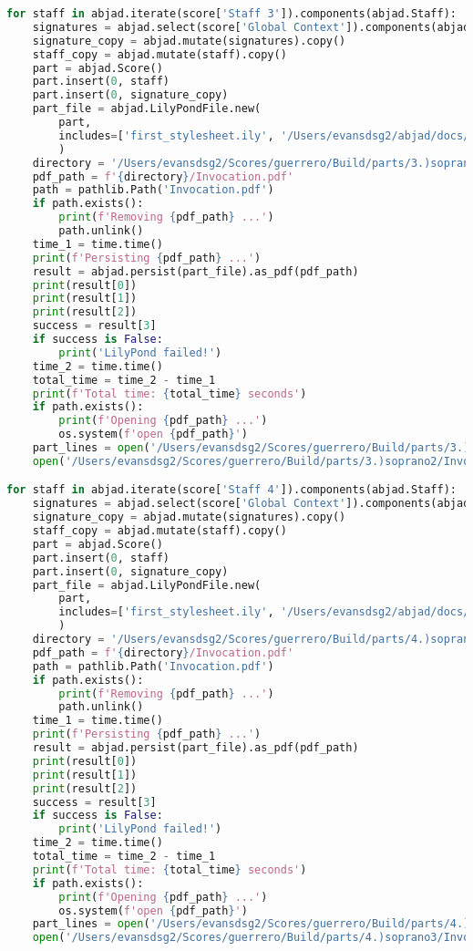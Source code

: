 \begin{lstlisting}[language=Python, caption=Invocation Source Code]
for staff in abjad.iterate(score['Staff 3']).components(abjad.Staff):
    signatures = abjad.select(score['Global Context']).components(abjad.Staff)
    signature_copy = abjad.mutate(signatures).copy()
    staff_copy = abjad.mutate(staff).copy()
    part = abjad.Score()
    part.insert(0, staff)
    part.insert(0, signature_copy)
    part_file = abjad.LilyPondFile.new(
        part,
        includes=['first_stylesheet.ily', '/Users/evansdsg2/abjad/docs/source/_stylesheets/abjad.ily'],
        )
    directory = '/Users/evansdsg2/Scores/guerrero/Build/parts/3.)soprano2'
    pdf_path = f'{directory}/Invocation.pdf'
    path = pathlib.Path('Invocation.pdf')
    if path.exists():
        print(f'Removing {pdf_path} ...')
        path.unlink()
    time_1 = time.time()
    print(f'Persisting {pdf_path} ...')
    result = abjad.persist(part_file).as_pdf(pdf_path)
    print(result[0])
    print(result[1])
    print(result[2])
    success = result[3]
    if success is False:
        print('LilyPond failed!')
    time_2 = time.time()
    total_time = time_2 - time_1
    print(f'Total time: {total_time} seconds')
    if path.exists():
        print(f'Opening {pdf_path} ...')
        os.system(f'open {pdf_path}')
    part_lines = open('/Users/evansdsg2/Scores/guerrero/Build/parts/3.)soprano2/Invocation.ly').readlines()
    open('/Users/evansdsg2/Scores/guerrero/Build/parts/3.)soprano2/Invocation.ly', 'w').writelines(part_lines[15:-1])

for staff in abjad.iterate(score['Staff 4']).components(abjad.Staff):
    signatures = abjad.select(score['Global Context']).components(abjad.Staff)
    signature_copy = abjad.mutate(signatures).copy()
    staff_copy = abjad.mutate(staff).copy()
    part = abjad.Score()
    part.insert(0, staff)
    part.insert(0, signature_copy)
    part_file = abjad.LilyPondFile.new(
        part,
        includes=['first_stylesheet.ily', '/Users/evansdsg2/abjad/docs/source/_stylesheets/abjad.ily'],
        )
    directory = '/Users/evansdsg2/Scores/guerrero/Build/parts/4.)soprano3'
    pdf_path = f'{directory}/Invocation.pdf'
    path = pathlib.Path('Invocation.pdf')
    if path.exists():
        print(f'Removing {pdf_path} ...')
        path.unlink()
    time_1 = time.time()
    print(f'Persisting {pdf_path} ...')
    result = abjad.persist(part_file).as_pdf(pdf_path)
    print(result[0])
    print(result[1])
    print(result[2])
    success = result[3]
    if success is False:
        print('LilyPond failed!')
    time_2 = time.time()
    total_time = time_2 - time_1
    print(f'Total time: {total_time} seconds')
    if path.exists():
        print(f'Opening {pdf_path} ...')
        os.system(f'open {pdf_path}')
    part_lines = open('/Users/evansdsg2/Scores/guerrero/Build/parts/4.)soprano3/Invocation.ly').readlines()
    open('/Users/evansdsg2/Scores/guerrero/Build/parts/4.)soprano3/Invocation.ly', 'w').writelines(part_lines[15:-1])


\end{lstlisting}
